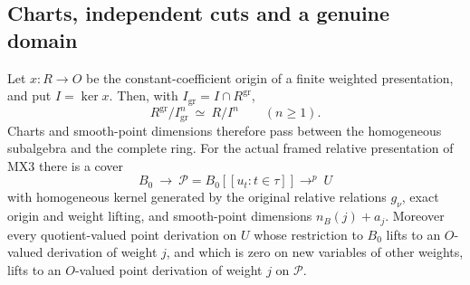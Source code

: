 \subsection{Charts, independent cuts and a genuine domain}

\begin{proposition}
\label{claim:MX4}
Let $x:R\to O$ be the constant-coefficient origin of a finite
weighted presentation, and put
$I=\ker x$.  Then, with $I_{\mathrm{gr}}=I\cap R^{\mathrm{gr}}$,
\[
 R^{\mathrm{gr}}/I_{\mathrm{gr}}^n\ \simeq\ R/I^n
                         \qquad(n\ge1).
 \tag{MX.13}
\]
Charts and smooth-point dimensions therefore pass between
the homogeneous subalgebra and the complete ring.
For the actual framed relative presentation of MX3 there
is a cover
\[
 B_0\ \longrightarrow\ \mathcal P=B_0[[u_t:t\in\tau]]
             \mathop{\longrightarrow}^{p}\ U
 \tag{MX.14}
\]
with homogeneous kernel generated by the original relative
relations $g_\nu$, exact origin and weight lifting, and
smooth-point dimensions $n_B(j)+a_j$.
Moreover every quotient-valued point derivation on $U$
whose restriction to $B_0$ lifts to an $O$-valued derivation
of weight $j$, and which is zero on new variables of other
weights, lifts to an $O$-valued point derivation of weight
$j$ on $\mathcal P$.
\end{proposition}
